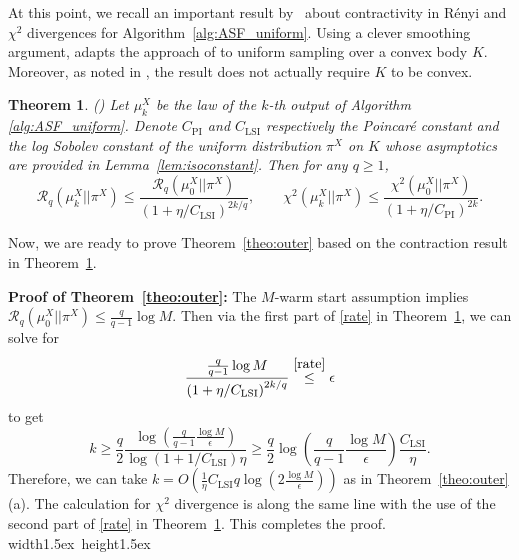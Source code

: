 \documentclass[11pt,letterpaper]{article}
\newcommand{\brac}[1]{\left( #1\right)}
\newcommand*{\QEDA}{\hfill\hbox{\vrule width1.5ex height1.5ex}}
\newtheorem{theorem}[thm]{Theorem}
\begin{document}

At this point, we recall an important result by~\cite{kook2024inandout} about contractivity in R\'enyi and $\chi^2$ divergences for Algorithm~\ref{alg:ASF_uniform}. Using a clever smoothing argument, \cite{kook2024inandout} adapts the approach of \cite{chen2022improved} to uniform sampling over a convex body $K$. Moreover, as noted in \cite{kook2024inandout}, the result does not actually require $K$ to be convex.


\begin{theorem}
    \label{theo:kooketal}
    (\cite[Theorem~23]{kook2024inandout}) Let $\mu^X_k$ be the law of the $k$-th output of Algorithm \ref{alg:ASF_uniform}. Denote $C_{\mathrm{PI}}$ and $C_{\mathrm{LSI}}$ respectively the Poincar\'{e} constant and the log Sobolev constant of the uniform distribution $\pi^X$ on $K$  whose asymptotics are provided in Lemma~\ref{lem:isoconstant}. Then for any $q\geq 1$,
\begin{equation}\label{rate}
    \mathcal{R}_q\brac{\mu^X_k||\pi^X}\leq \frac{\mathcal{R}_q\brac{\mu^X_0||\pi^X}}{\brac{1+{\eta}/{C_{\mathrm{LSI}}}}^{2k/q}},\qquad  \chi^2\brac{\mu^X_k||\pi^X}\leq \frac{\chi^2\brac{\mu^X_0||\pi^X}}{\brac{1+{\eta}/{C_{\mathrm{PI}}}}^{2k}}. 
\end{equation}
\end{theorem} 


\vspace{3mm}

Now, we are ready to prove Theorem~\ref{theo:outer} based on the contraction result in Theorem~\ref{theo:kooketal}. 

\vspace{3mm}

\noindent
\textbf{Proof of Theorem~\ref{theo:outer}:}
The $M$-warm start assumption implies $\mathcal{R}_q\brac{\mu^X_0||\pi^X}\leq \frac{q}{q-1}\log M$. Then via the first part of \eqref{rate} in Theorem~\ref{theo:kooketal},  we can solve for 
    \[
        \frac{\frac{q}{q-1}\log M}{\brac{1+\eta/C_{\mathrm{LSI}}}^{2k/q}} \stackrel{\eqref{rate}}\leq \epsilon
    \]
to get 
\[
   k\geq \frac{q}{2}\frac{\log \brac{\frac{q}{q-1}\frac{\log M}{\epsilon}} }{\log\brac{1+1/C_{\mathrm{LSI}}}\eta}\geq  \frac{q}{2}\log \brac{\frac{q}{q-1}\frac{\log M}{\epsilon}} \frac{C_{\mathrm{LSI}}}{\eta}.
\]
Therefore, we can take $k=O\brac{\frac{1}{\eta}{C_{\mathrm{LSI}}q\log \brac{2\frac{\log M}{\epsilon}} }}$ as in Theorem~\ref{theo:outer}(a). The calculation for $\chi^2$ divergence is along the same line with the use of the second part of \eqref{rate} in Theorem~\ref{theo:kooketal}. This completes the proof. 
\QEDA
\end{document}
